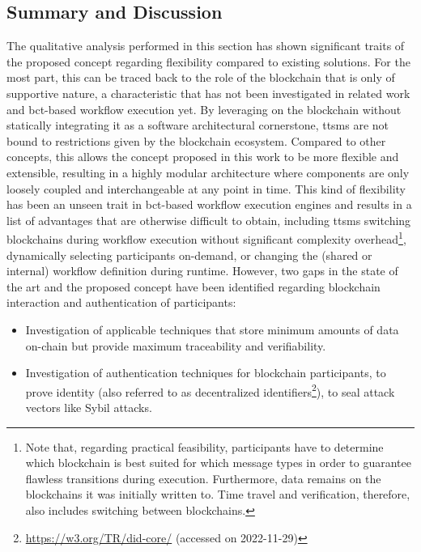 \subsection{Summary and Discussion}
\label{sec:evaluation:qualitative_analysis:summary}
The qualitative analysis performed in this section has shown significant traits of the proposed concept regarding flexibility compared to existing solutions. For the most part, this can be traced back to the role of the blockchain that is only of supportive nature, a characteristic that has not been investigated in related work and \gls{bct}-based workflow execution yet. By leveraging on the blockchain without statically integrating it as a software architectural cornerstone, \glspl{ttsm} are not bound to restrictions given by the blockchain ecosystem. Compared to other concepts, this allows the concept proposed in this work to be more flexible and extensible, resulting in a highly modular architecture where components are only loosely coupled and interchangeable at any point in time. This kind of flexibility has been an unseen trait in \gls{bct}-based workflow execution engines and results in a list of advantages that are otherwise difficult to obtain, including \glspl{ttsm} switching blockchains during workflow execution without significant complexity overhead\footnote{Note that, regarding practical feasibility, participants have to determine which blockchain is best suited for which message types in order to guarantee flawless transitions during execution. Furthermore, data remains on the blockchains it was initially written to. Time travel and verification, therefore, also includes switching between blockchains.}, dynamically selecting participants on-demand, or changing the (shared or internal) workflow definition during runtime. However, two gaps in the state of the art and the proposed concept have been identified regarding blockchain interaction and authentication of participants:

\begin{itemize}
    \item Investigation of applicable techniques that store minimum amounts of data on-chain but provide maximum traceability and verifiability.
    \item Investigation of authentication techniques for blockchain participants, to prove identity (also referred to as decentralized identifiers\footnote{\url{https://w3.org/TR/did-core/} (accessed on 2022-11-29)}), to seal attack vectors like Sybil attacks.
\end{itemize}

